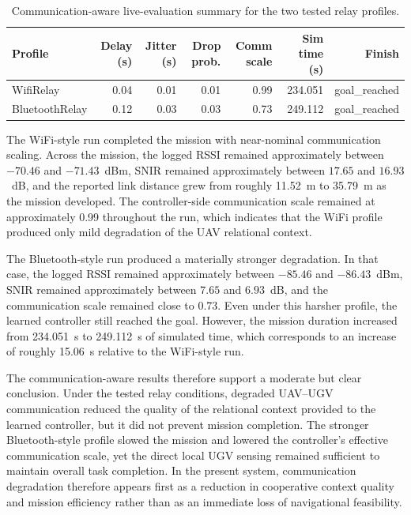 \begin{table}[tbp]
    \caption{Communication-aware live-evaluation summary for the two tested relay profiles.}
    \label{tab:communication_profile_summary}
    \centering
    \small
    \setlength{\tabcolsep}{4pt}
    \renewcommand{\arraystretch}{1.12}
    \begin{tabular}{@{}lrrrrrr@{}}
        \toprule
        \textbf{Profile} & \textbf{Delay (s)} & \textbf{Jitter (s)} & \textbf{Drop prob.} & \textbf{Comm scale} & \textbf{Sim time (s)} & \textbf{Finish} \\
        \midrule
        WifiRelay & 0.04 & 0.01 & 0.01 & 0.99 & 234.051 & goal\_reached \\
        BluetoothRelay & 0.12 & 0.03 & 0.03 & 0.73 & 249.112 & goal\_reached \\
        \bottomrule
    \end{tabular}
\end{table}

The WiFi-style run completed the mission with near-nominal communication scaling. Across the mission, the logged RSSI remained approximately between $-70.46$ and $-71.43$~dBm, SNIR remained approximately between $17.65$ and $16.93$~dB, and the reported link distance grew from roughly 11.52~m to 35.79~m as the mission developed. The controller-side communication scale remained at approximately 0.99 throughout the run, which indicates that the WiFi profile produced only mild degradation of the UAV relational context.

The Bluetooth-style run produced a materially stronger degradation. In that case, the logged RSSI remained approximately between $-85.46$ and $-86.43$~dBm, SNIR remained approximately between $7.65$ and $6.93$~dB, and the communication scale remained close to 0.73. Even under this harsher profile, the learned controller still reached the goal. However, the mission duration increased from 234.051~s to 249.112~s of simulated time, which corresponds to an increase of roughly 15.06~s relative to the WiFi-style run.

The communication-aware results therefore support a moderate but clear conclusion. Under the tested relay conditions, degraded UAV--UGV communication reduced the quality of the relational context provided to the learned controller, but it did not prevent mission completion. The stronger Bluetooth-style profile slowed the mission and lowered the controller's effective communication scale, yet the direct local UGV sensing remained sufficient to maintain overall task completion. In the present system, communication degradation therefore appears first as a reduction in cooperative context quality and mission efficiency rather than as an immediate loss of navigational feasibility.
